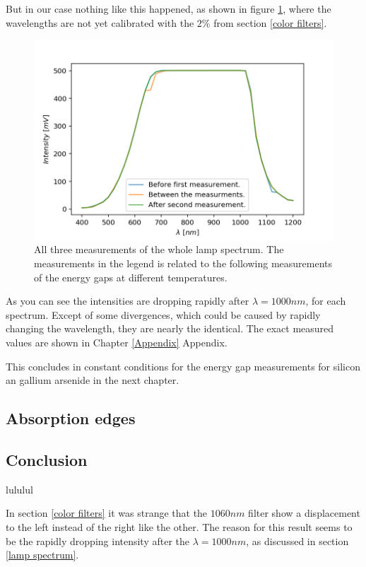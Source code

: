 \documentclass[]{article}
\begin{document}
 But in our case nothing like this happened, as shown in figure \ref{fig:lamp spectra}, where the wavelengths are not yet calibrated with the $2\%$ from section \ref{color filters}.

\begin{figure}[H]
\centering
\includegraphics[width=.8\textwidth]{Plots/All-Lamp-Spectra.png}
\caption{All three measurements of the whole lamp spectrum. The measurements in the legend is related to the following measurements of the energy gaps at different temperatures. }
\label{fig:lamp spectra}
\end{figure} 

As you can see the intensities are dropping rapidly after  $\lambda =1000nm$, for each spectrum. Except of some divergences, which could be caused by rapidly changing the wavelength, they are nearly the identical. The exact measured values are shown in Chapter \ref{Appendix} Appendix.

This concludes in constant conditions for the energy gap measurements for silicon an gallium arsenide in the next chapter.

\subsection{Absorption edges}
\subsection{Conclusion} \label{Conclusion}
lululul

In section \ref{color filters} it was strange that the $1060nm$ filter show a displacement to the left instead of the right like the other. The reason for this result seems to be the rapidly dropping intensity after the $\lambda =1000nm$, as discussed in section \ref{lamp spectrum}. 
\end{document}
